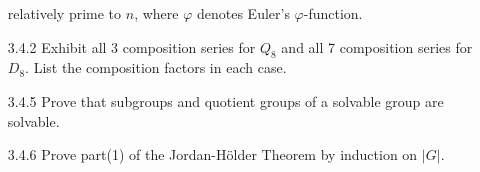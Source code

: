 \documentclass[9pt]{article}
\begin{document}
\begin{enumerate}
                  relatively prime to $n$, where $\varphi$ denotes Euler's
                  $\varphi$-function.
   \item[3.4.2]   Exhibit all 3 composition series for $Q_8$ and all 7 
                  composition series for $D_8$. List the composition factors in
                  each case.
   \item[3.4.5]   Prove that subgroups and quotient groups of a solvable group
                  are solvable.
   \item[3.4.6]   Prove part(1) of the Jordan-H\"{o}lder Theorem by induction on
                  $|G|$.
\end{enumerate}
\end{document}

